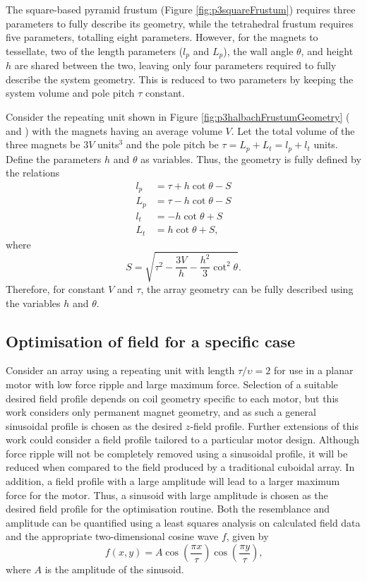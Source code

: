 The square-based pyramid frustum (Figure \ref{fig:p3squareFrustum}) requires three parameters to fully describe its geometry, while the tetrahedral frustum requires five parameters, totalling eight parameters. However, for the magnets to tessellate, two of the length parameters (\(l_p\) and \(L_p\)), the wall angle \(\theta\), and height \(h\) are shared between the two, leaving only four parameters required to fully describe the system geometry. This is reduced to two parameters by keeping the system volume and pole pitch \(\tau\) constant.

Consider the repeating unit shown in Figure \ref{fig:p3halbachFrustumGeometry} ( and ) with the magnets having an average volume \(V\). Let the total volume of the three magnets be \(3V\) units\(^3\) and the pole pitch be \(\tau = L_p + L_t = l_p + l_t\) units. Define the parameters \(h\) and \(\theta\) as variables. Thus, the geometry is fully defined by the relations
\begin{align}
l_p &= \tau + h \cot \theta - S \\ 
L_p &= \tau - h \cot \theta - S \\
l_t &= -h \cot \theta + S \\
L_t &= h \cot \theta + S \text{,}
\end{align}
where
\begin{equation}
S = \sqrt{\tau^2 - \frac{3V}{h} - \frac{h^2}{3} \cot^2\theta} \text{.}
\end{equation}
Therefore, for constant \(V\) and \(\tau\), the array geometry can be fully described using the variables \(h\) and \(\theta\).

\subsection{Optimisation of field for a specific case}\label{sec:p3specificOptimisation}
Consider an array using a repeating unit with length \(\tau/\upsilon = 2\) for use in a planar motor with low force ripple and large maximum force. Selection of a suitable desired field profile depends on coil geometry specific to each motor, but this work considers only permanent magnet geometry, and as such a general sinusoidal profile is chosen as the desired \(z\)-field profile. Further extensions of this work could consider a field profile tailored to a particular motor design. Although force ripple will not be completely removed using a sinusoidal profile, it will be reduced when compared to the field produced by a traditional cuboidal array. In addition, a field profile with a large amplitude will lead to a larger maximum force for the motor. Thus, a sinusoid with large amplitude is chosen as the desired field profile for the optimisation routine. Both the resemblance and amplitude can be quantified using a least squares analysis on calculated field data and the appropriate two-dimensional cosine wave \(f\), given by
\begin{equation}\label{eqn:p3cosineWave}
f\left(x,y\right) = A\cos\left(\frac{\pi x}{\tau}\right)\cos\left(\frac{\pi y}{\tau}\right) \text{,}
\end{equation}
where \(A\) is the amplitude of the sinusoid.

